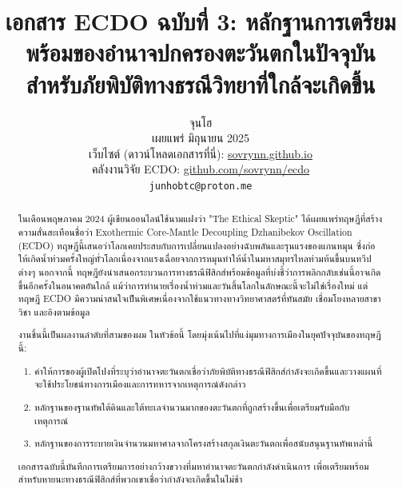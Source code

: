\documentclass[10pt,twocolumn,letterpaper]{article}
\begin{document}
\title{เอกสาร ECDO ฉบับที่ 3: หลักฐานการเตรียมพร้อมของอำนาจปกครองตะวันตกในปัจจุบันสำหรับภัยพิบัติทางธรณีวิทยาที่ใกล้จะเกิดขึ้น}

\author{จุนโฮ\\
เผยแพร่ มิถุนายน 2025\\
เว็บไซต์ (ดาวน์โหลดเอกสารที่นี่): \href{https://sovrynn.github.io}{sovrynn.github.io}\\
คลังงานวิจัย ECDO: \href{https://github.com/sovrynn/ecdo}{github.com/sovrynn/ecdo}\\
{\tt\small junhobtc@proton.me}
}
\maketitle

\begin{abstract}
ในเดือนพฤษภาคม 2024 ผู้เขียนออนไลน์ใช้นามแฝงว่า "The Ethical Skeptic" \cite{0} ได้เผยแพร่ทฤษฎีที่สร้างความสั่นสะเทือนชื่อว่า Exothermic Core-Mantle Decoupling Dzhanibekov Oscillation (ECDO) \cite{1} ทฤษฎีนี้เสนอว่าโลกเคยประสบกับการเปลี่ยนแปลงอย่างฉับพลันและรุนแรงของแกนหมุน ซึ่งก่อให้เกิดน้ำท่วมครั้งใหญ่ทั่วโลกเนื่องจากแรงเฉื่อยจากการหมุนทำให้น้ำในมหาสมุทรไหลท่วมท้นขึ้นบนทวีปต่างๆ นอกจากนี้ ทฤษฎียังนำเสนอกระบวนการทางธรณีฟิสิกส์พร้อมข้อมูลที่บ่งชี้ว่าการพลิกกลับเช่นนี้อาจเกิดขึ้นอีกครั้งในอนาคตอันใกล้ แม้ว่าการทำนายเรื่องน้ำท่วมและวันสิ้นโลกในลักษณะนี้จะไม่ใช่เรื่องใหม่ แต่ทฤษฎี ECDO มีความน่าสนใจเป็นพิเศษเนื่องจากใช้แนวทางทางวิทยาศาสตร์ที่ทันสมัย เชื่อมโยงหลายสาขาวิชา และอิงตามข้อมูล

งานชิ้นนี้เป็นผลงานลำดับที่สามของผม \cite{2,3} ในหัวข้อนี้ โดยมุ่งเน้นไปที่แง่มุมทางการเมืองในยุคปัจจุบันของทฤษฎีนี้:
\begin{flushleft}
\begin{enumerate}
    \item คำให้การของผู้เปิดโปงที่ระบุว่าอำนาจตะวันตกเชื่อว่าภัยพิบัติทางธรณีฟิสิกส์กำลังจะเกิดขึ้นและวางแผนที่จะใช้ประโยชน์ทางการเมืองและการทหารจากเหตุการณ์ดังกล่าว
    \item หลักฐานของฐานทัพใต้ดินและใต้ทะเลจำนวนมากของตะวันตกที่ถูกสร้างขึ้นเพื่อเตรียมรับมือกับเหตุการณ์
    \item หลักฐานของการระบายเงินจำนวนมหาศาลจากโครงสร้างสกุลเงินตะวันตกเพื่อสนับสนุนฐานทัพเหล่านี้
\end{enumerate}
\end{flushleft}
เอกสารฉบับนี้บันทึกการเตรียมการอย่างกว้างขวางที่มหาอำนาจตะวันตกกำลังดำเนินการ เพื่อเตรียมพร้อมสำหรับหายนะทางธรณีฟิสิกส์ที่พวกเขาเชื่อว่ากำลังจะเกิดขึ้นในไม่ช้า
\end{abstract}
\end{document}
